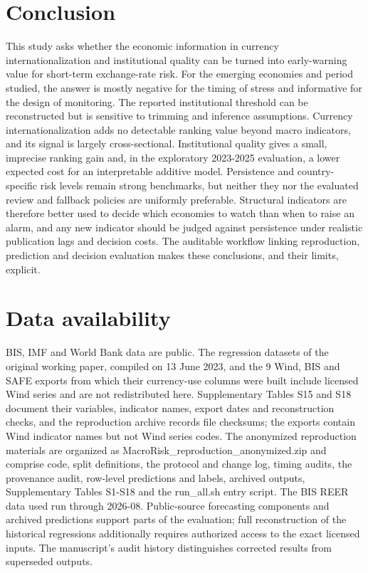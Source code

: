\documentclass[preprint,12pt,authoryear]{elsarticle}
\begin{document}
\section{Conclusion}
This study asks whether the economic information in currency internationalization and institutional quality can be turned into early-warning value for short-term exchange-rate risk. For the emerging economies and period studied, the answer is mostly negative for the timing of stress and informative for the design of monitoring. The reported institutional threshold can be reconstructed but is sensitive to trimming and inference assumptions. Currency internationalization adds no detectable ranking value beyond macro indicators, and its signal is largely cross-sectional. Institutional quality gives a small, imprecise ranking gain and, in the exploratory 2023-2025 evaluation, a lower expected cost for an interpretable additive model. Persistence and country-specific risk levels remain strong benchmarks, but neither they nor the evaluated review and fallback policies are uniformly preferable. Structural indicators are therefore better used to decide which economies to watch than when to raise an alarm, and any new indicator should be judged against persistence under realistic publication lags and decision costs. The auditable workflow linking reproduction, prediction and decision evaluation makes these conclusions, and their limits, explicit.

\section*{Data availability}
BIS, IMF and World Bank data are public. The regression datasets of the original working paper, compiled on 13 June 2023, and the 9 Wind, BIS and SAFE exports from which their currency-use columns were built include licensed Wind series and are not redistributed here. Supplementary Tables S15 and S18 document their variables, indicator names, export dates and reconstruction checks, and the reproduction archive records file checksums; the exports contain Wind indicator names but not Wind series codes. The anonymized reproduction materials are organized as MacroRisk\_reproduction\_anonymized.zip and comprise code, split definitions, the protocol and change log, timing audits, the provenance audit, row-level predictions and labels, archived outputs, Supplementary Tables S1-S18 and the run\_all.sh entry script. The BIS REER data used run through 2026-08. Public-source forecasting components and archived predictions support parts of the evaluation; full reconstruction of the historical regressions additionally requires authorized access to the exact licensed inputs. The manuscript's audit history distinguishes corrected results from superseded outputs.
\end{document}
